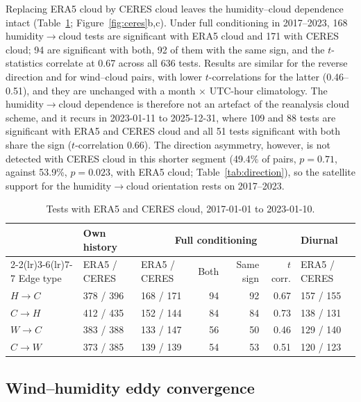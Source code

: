 \documentclass[preprint,12pt]{elsarticle}
\begin{document}
Replacing ERA5 cloud by CERES cloud leaves the humidity--cloud dependence intact (Table~\ref{tab:ceres}; Figure~\ref{fig:ceres}b,c). Under full conditioning in 2017--2023, 168 humidity$\rightarrow$cloud tests are significant with ERA5 cloud and 171 with CERES cloud; 94 are significant with both, 92 of them with the same sign, and the $t$-statistics correlate at 0.67 across all 636 tests. Results are similar for the reverse direction and for wind--cloud pairs, with lower $t$-correlations for the latter (0.46--0.51), and they are unchanged with a month $\times$ UTC-hour climatology. The humidity$\rightarrow$cloud dependence is therefore not an artefact of the reanalysis cloud scheme, and it recurs in 2023-01-11 to 2025-12-31, where 109 and 88 tests are significant with ERA5 and CERES cloud and all 51 tests significant with both share the sign ($t$-correlation 0.66). The direction asymmetry, however, is not detected with CERES cloud in this shorter segment (49.4\% of pairs, $p=0.71$, against 53.9\%, $p=0.023$, with ERA5 cloud; Table~\ref{tab:direction}), so the satellite support for the humidity$\rightarrow$cloud orientation rests on 2017--2023.

\begin{table}[htbp]
\centering
\caption{Tests with ERA5 and CERES cloud, 2017-01-01 to 2023-01-10.}
\label{tab:ceres}
\footnotesize
\setlength{\tabcolsep}{2.8pt}
\begin{tabular}{@{}lllrrrl@{}}
\toprule
& Own history & \multicolumn{4}{c}{Full conditioning} & Diurnal \\
\cmidrule(lr){2-2}\cmidrule(lr){3-6}\cmidrule(lr){7-7}
Edge type & ERA5 / CERES & ERA5 / CERES & Both & Same sign & $t$ corr. & ERA5 / CERES \\
\midrule
$H\rightarrow C$ & 378 / 396 & 168 / 171 & 94 & 92 & 0.67 & 157 / 155 \\
$C\rightarrow H$ & 412 / 435 & 152 / 144 & 84 & 84 & 0.73 & 138 / 131 \\
$W\rightarrow C$ & 383 / 388 & 133 / 147 & 56 & 50 & 0.46 & 129 / 140 \\
$C\rightarrow W$ & 373 / 385 & 139 / 139 & 54 & 53 & 0.51 & 120 / 123 \\
\bottomrule
\end{tabular}
\end{table}

\subsection{Wind--humidity eddy convergence}
\label{subsec:whec_res}
\end{document}

